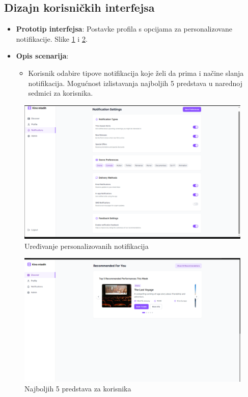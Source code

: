 \subsection{Dizajn korisničkih interfejsa}  
\begin{itemize}  
    \item \textbf{Prototip interfejsa}: Postavke profila s opcijama za personalizovane notifikacije. Slike \ref{fig:fz8.1} i \ref{fig:fz8.2}. 
    \item \textbf{Opis scenarija}:  
        \begin{itemize}  
            \item Korisnik odabire tipove notifikacija koje želi da prima i načine slanja notifikacija. Mogućnost izlistavanja najboljih 5 predstava u narednoj sedmici za korisnika. 
        \end{itemize}  
\end{itemize}  
\begin{figure}[H]
        \centering
        \includegraphics[width=1\linewidth]{Slike/FZ8.1.PNG}
        \caption{Uređivanje personalizovanih notifikacija}
        \label{fig:fz8.1}
    \end{figure}
    \begin{figure}[H]
        \centering
        \includegraphics[width=1\linewidth]{Slike/FZ8.2.PNG}
        \caption{Najboljih 5 predstava za korisnika}
        \label{fig:fz8.2}
    \end{figure}
\sloppy  
\pagebreak
